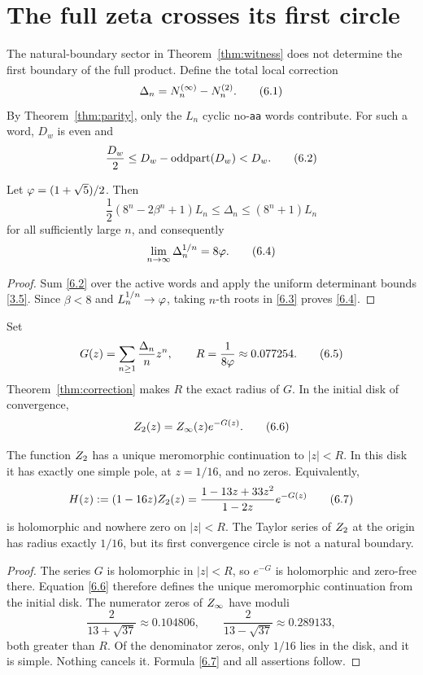 \section{The full zeta crosses its first circle}
\label{sec:global}

The natural-boundary sector in Theorem~\ref{thm:witness} does not determine
the first boundary of the full product.  Define the total local correction
\[
 \Delta_n=N^{(\infty)}_n-N^{(2)}_n.
 \tag{6.1}\label{6.1}
\]
By Theorem~\ref{thm:parity}, only the \(L_n\) cyclic no-\texttt{aa} words
contribute.  For such a word, \(D_w\) is even and
\[
 \frac{D_w}{2}
 \le D_w-\operatorname{oddpart}(D_w)<D_w.
 \tag{6.2}\label{6.2}
\]

\begin{theorem}
\label{thm:correction}
Let \(\varphi=(1+\sqrt5)/2\).  Then
\[
 \frac12(8^n-2\beta^n+1)L_n
 \le\Delta_n\le(8^n+1)L_n
 \tag{6.3}\label{6.3}
\]
for all sufficiently large \(n\), and consequently
\[
 \lim_{n\to\infty}\Delta_n^{1/n}=8\varphi.
 \tag{6.4}\label{6.4}
\]
\end{theorem}

\begin{proof}
Sum \eqref{6.2} over the active words and apply the uniform determinant
bounds \eqref{3.5}.  Since \(\beta<8\) and \(L_n^{1/n}\to\varphi\), taking
\(n\)-th roots in \eqref{6.3} proves \eqref{6.4}.
\end{proof}

Set
\[
 G(z)=\sum_{n\ge1}\frac{\Delta_n}{n}z^n,
 \qquad R=\frac1{8\varphi}\approx0.077254.
 \tag{6.5}\label{6.5}
\]
Theorem~\ref{thm:correction} makes \(R\) the exact radius of \(G\).  In the
initial disk of convergence,
\[
 Z_{2}(z)=Z_{\infty}(z)e^{-G(z)}.
 \tag{6.6}\label{6.6}
\]

\begin{theorem}
\label{thm:continuation}
The function \(Z_{2}\) has a unique meromorphic continuation to \(|z|<R\).
In this disk it has exactly one simple pole, at \(z=1/16\), and no zeros.
Equivalently,
\[
 H(z):=(1-16z)Z_{2}(z)
 =\frac{1-13z+33z^2}{1-2z}e^{-G(z)}
 \tag{6.7}\label{6.7}
\]
is holomorphic and nowhere zero on \(|z|<R\).  The Taylor series of
\(Z_{2}\) at the origin has radius exactly \(1/16\), but its first
convergence circle is not a natural boundary.
\end{theorem}

\begin{proof}
The series \(G\) is holomorphic in \(|z|<R\), so \(e^{-G}\) is holomorphic
and zero-free there.  Equation \eqref{6.6} therefore defines the unique
meromorphic continuation from the initial disk.  The numerator zeros of
\(Z_{\infty}\) have moduli
\[
 \frac{2}{13+\sqrt{37}}\approx0.104806,
 \qquad
 \frac{2}{13-\sqrt{37}}\approx0.289133,
\]
both greater than \(R\).  Of the denominator zeros, only \(1/16\) lies in
the disk, and it is simple.  Nothing cancels it.  Formula \eqref{6.7} and all
assertions follow.
\end{proof}

